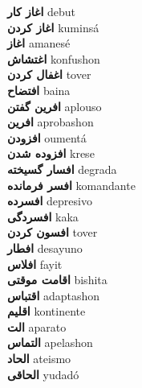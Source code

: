 \textbf{ اغاز کار  } debut \\
\textbf{ اغاز کردن  } kuminsá \\
\textbf{ اغاز  } amanesé \\
\textbf{ اغتشاش  } konfushon \\
\textbf{ اغفال کردن  } tover \\
\textbf{ افتضاح  } baina \\
\textbf{ افرین گفتن  } aplouso \\
\textbf{ افرین  } aprobashon \\
\textbf{ افزودن  } oumentá \\
\textbf{ افزوده شدن  } krese \\
\textbf{ افسار گسیخته  } degrada \\
\textbf{ افسر فرمانده  } komandante \\
\textbf{ افسرده  } depresivo \\
\textbf{ افسردگی  } kaka \\
\textbf{ افسون کردن  } tover \\
\textbf{ افطار  } desayuno \\
\textbf{ افلاس  } fayit \\
\textbf{ اقامت موقتی  } bishita \\
\textbf{ اقتباس  } adaptashon \\
\textbf{ اقلیم  } kontinente \\
\textbf{ الت  } aparato \\
\textbf{ التماس  } apelashon \\
\textbf{ الحاد  } ateismo \\
\textbf{ الحاقی  } yudadó \\
